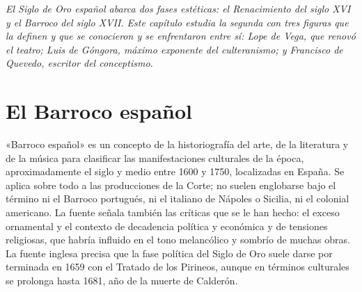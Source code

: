 \documentclass{book}
\begin{document}
\noindent\textit{El Siglo de Oro español abarca dos fases estéticas: el Renacimiento del siglo XVI y el Barroco del siglo XVII. Este capítulo estudia la segunda con tres figuras que la definen y que se conocieron y se enfrentaron entre sí: Lope de Vega, que renovó el teatro; Luis de Góngora, máximo exponente del culteranismo; y Francisco de Quevedo, escritor del conceptismo.}


\section{El Barroco español}

«Barroco español» es un concepto de la historiografía del arte, de la literatura y de la música para clasificar las manifestaciones culturales de la época, aproximadamente el siglo y medio entre 1600 y 1750, localizadas en España. Se aplica sobre todo a las producciones de la Corte; no suelen englobarse bajo el término ni el Barroco portugués, ni el italiano de Nápoles o Sicilia, ni el colonial americano. La fuente señala también las críticas que se le han hecho: el exceso ornamental y el contexto de decadencia política y económica y de tensiones religiosas, que habría influido en el tono melancólico y sombrío de muchas obras. La fuente inglesa precisa que la fase política del Siglo de Oro suele darse por terminada en 1659 con el Tratado de los Pirineos, aunque en términos culturales se prolonga hasta 1681, año de la muerte de Calderón.

\end{document}
